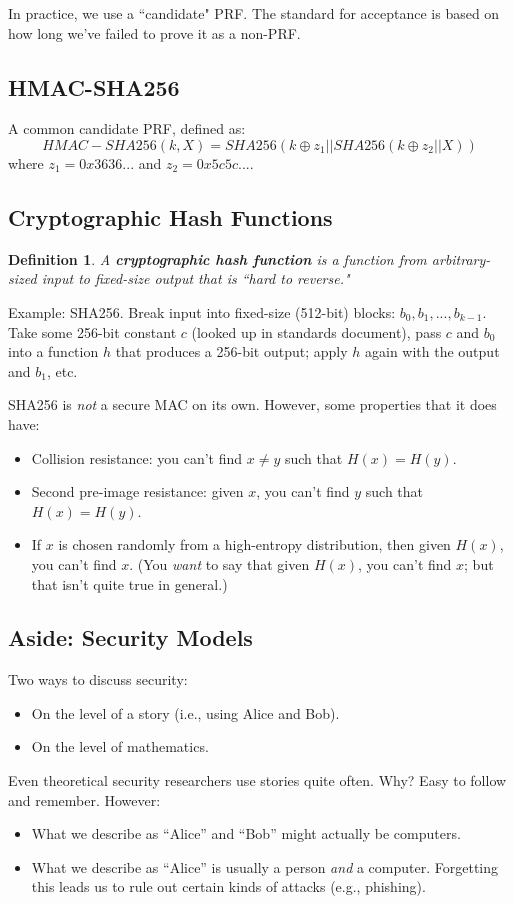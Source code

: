 \documentclass[12pt]{article}
\newtheorem*{mydef}{Definition}
\begin{document}
In practice, we use a ``candidate" PRF. The standard for acceptance is based on how long we've failed to prove it as a non-PRF.

\subsection*{HMAC-SHA256}

A common candidate PRF, defined as: $$HMAC-SHA256(k, X) = SHA256(k \oplus z_1 || SHA256(k \oplus z_2 || X))$$ where $z_1 = 0x3636...$ and $z_2 = 0x5c5c...$.

\subsection*{Cryptographic Hash Functions}

\begin{mydef}
A \textbf{cryptographic hash function} is a function from arbitrary-sized input to fixed-size output that is ``hard to reverse."
\end{mydef}

Example: SHA256. Break input into fixed-size (512-bit) blocks: $b_0, b_1, ..., b_{k-1}$. Take some 256-bit constant $c$ (looked up in standards document), pass $c$ and $b_0$ into a function $h$ that produces a 256-bit output; apply $h$ again with the output and $b_1$, etc.

SHA256 is \textit{not} a secure MAC on its own. However, some properties that it does have:
\begin{itemize}
\item Collision resistance: you can't find $x \not = y$ such that $H(x) = H(y)$.
\item Second pre-image resistance: given $x$, you can't find $y$ such that $H(x) = H(y)$.
\item If $x$ is chosen randomly from a high-entropy distribution, then given $H(x)$, you can't find $x$. (You \textit{want} to say that given $H(x)$, you can't find $x$; but that isn't quite true in general.)
\end{itemize}

\subsection*{Aside: Security Models}

Two ways to discuss security:
\begin{itemize}
\item On the level of a story (i.e., using Alice and Bob).
\item On the level of mathematics.
\end{itemize}

Even theoretical security researchers use stories quite often. Why? Easy to follow and remember. However:
\begin{itemize}
\item What we describe as ``Alice'' and ``Bob'' might actually be computers.
\item What we describe as ``Alice'' is usually a person \textit{and} a computer. Forgetting this leads us to rule out certain kinds of attacks (e.g., phishing).
\end{itemize}
\end{document}
